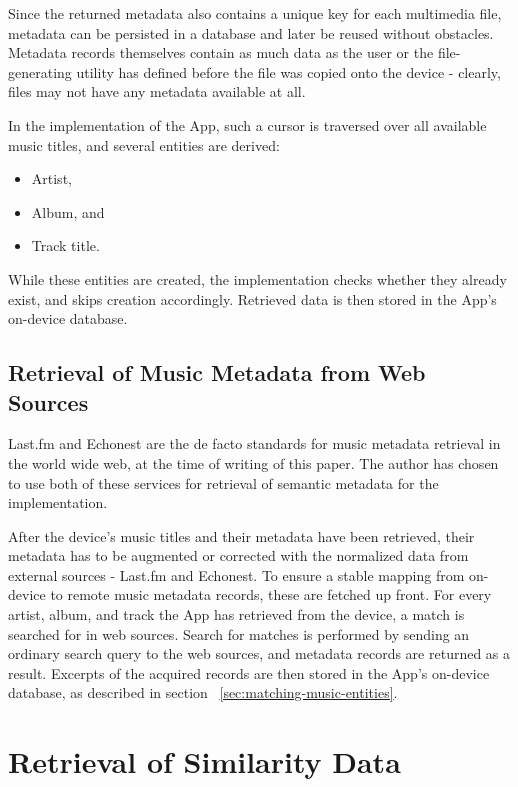 Since the returned metadata also contains a unique key for each multimedia file, metadata can be
persisted in a database and later be reused without obstacles.
Metadata records themselves contain as much data as the user or the file-generating utility has defined
before the file was copied onto the device - clearly, files may not have any metadata available at all.

In the implementation of the App, such a cursor is traversed over all available music titles, and several entities are derived:

\begin{itemize}
	\item Artist,
	\item Album, and
	\item Track title.
\end{itemize}

While these entities are created, the implementation checks whether they already exist, and skips creation accordingly. Retrieved data is then stored in the App's on-device database.

\subsection{Retrieval of Music Metadata from Web Sources}

Last.fm \cite{url:lastfm} and Echonest \cite{url:echonest} are the de facto standards for music metadata retrieval in the world wide web, 
at the time of writing of this paper. The author has chosen to use both of these services for retrieval 
of semantic metadata for the implementation. 

After the device's music titles and their metadata have been retrieved, their metadata has to be augmented or corrected with the normalized data from external sources - Last.fm and Echonest. To ensure a stable mapping from on-device to remote music metadata records, these are fetched up front. For every artist, album, and track the App has retrieved from the device, a match is searched for in web sources. Search for matches is performed by sending an ordinary search query to the web sources, and metadata records are returned as a result. Excerpts of the acquired records are then stored in the App's on-device database, as described in section ~\ref{sec:matching-music-entities}.

\section{Retrieval of Similarity Data}

